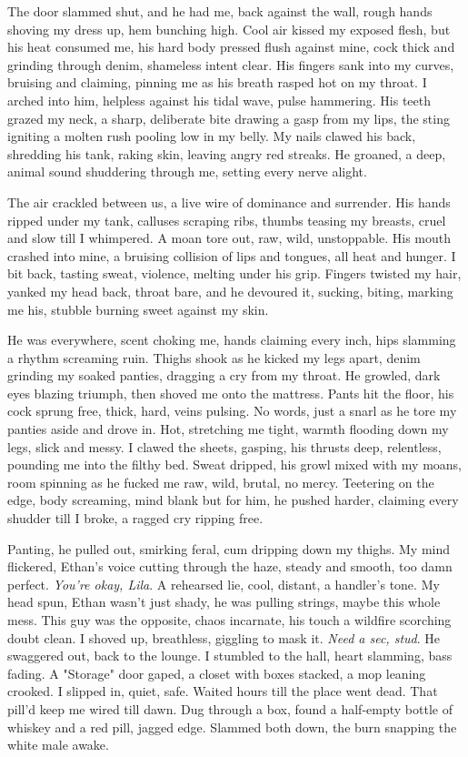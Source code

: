 \documentclass[12pt,oneside]{book}
\begin{document}
The door slammed shut, and he had me, back against the wall, rough hands shoving my dress up, hem bunching high. Cool air kissed my exposed flesh, but his heat consumed me, his hard body pressed flush against mine, cock thick and grinding through denim, shameless intent clear. His fingers sank into my curves, bruising and claiming, pinning me as his breath rasped hot on my throat. I arched into him, helpless against his tidal wave, pulse hammering. His teeth grazed my neck, a sharp, deliberate bite drawing a gasp from my lips, the sting igniting a molten rush pooling low in my belly. My nails clawed his back, shredding his tank, raking skin, leaving angry red streaks. He groaned, a deep, animal sound shuddering through me, setting every nerve alight.

The air crackled between us, a live wire of dominance and surrender. His hands ripped under my tank, calluses scraping ribs, thumbs teasing my breasts, cruel and slow till I whimpered. A moan tore out, raw, wild, unstoppable. His mouth crashed into mine, a bruising collision of lips and tongues, all heat and hunger. I bit back, tasting sweat, violence, melting under his grip. Fingers twisted my hair, yanked my head back, throat bare, and he devoured it, sucking, biting, marking me his, stubble burning sweet against my skin.

He was everywhere, scent choking me, hands claiming every inch, hips slamming a rhythm screaming ruin. Thighs shook as he kicked my legs apart, denim grinding my soaked panties, dragging a cry from my throat. He growled, dark eyes blazing triumph, then shoved me onto the mattress. Pants hit the floor, his cock sprung free, thick, hard, veins pulsing. No words, just a snarl as he tore my panties aside and drove in. Hot, stretching me tight, warmth flooding down my legs, slick and messy. I clawed the sheets, gasping, his thrusts deep, relentless, pounding me into the filthy bed. Sweat dripped, his growl mixed with my moans, room spinning as he fucked me raw, wild, brutal, no mercy. Teetering on the edge, body screaming, mind blank but for him, he pushed harder, claiming every shudder till I broke, a ragged cry ripping free.

Panting, he pulled out, smirking feral, cum dripping down my thighs. My mind flickered, Ethan’s voice cutting through the haze, steady and smooth, too damn perfect. \textit{You’re okay, Lila}. A rehearsed lie, cool, distant, a handler’s tone. My head spun, Ethan wasn’t just shady, he was pulling strings, maybe this whole mess. This guy was the opposite, chaos incarnate, his touch a wildfire scorching doubt clean. I shoved up, breathless, giggling to mask it. \textit{Need a sec, stud}. He swaggered out, back to the lounge. I stumbled to the hall, heart slamming, bass fading. A "Storage" door gaped, a closet with boxes stacked, a mop leaning crooked. I slipped in, quiet, safe. Waited hours till the place went dead. That pill’d keep me wired till dawn. Dug through a box, found a half-empty bottle of whiskey and a red pill, jagged edge. Slammed both down, the burn snapping the white male awake.
\end{document}
